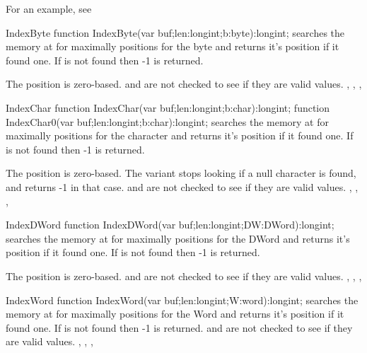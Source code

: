 For an example, see 

\begin{function}{IndexByte}
\Declaration
function  IndexByte(var buf;len:longint;b:byte):longint;
\Description
{} searches the memory at  for maximally 
positions for the byte  and returns it's position if it found one.
If  is not found then -1 is returned.

The position is zero-based.
\Errors
{} and  are not checked to see if they are valid values.
\SeeAlso
{}, , , 
\end{function}


\begin{function}{IndexChar}
\Declaration
function  IndexChar(var buf;len:longint;b:char):longint;
\Declaration
function  IndexChar0(var buf;len:longint;b:char):longint;
\Description
{} searches the memory at  for maximally 
positions for the character  and returns it's position if it found one.
If  is not found then -1 is returned.

The position is zero-based. The  variant stops looking if
a null character is found, and returns -1 in that case.
\Errors
{} and  are not checked to see if they are valid values.
\SeeAlso
{}, , , 
\end{function}


\begin{function}{IndexDWord}
\Declaration
function  IndexDWord(var buf;len:longint;DW:DWord):longint;
\Description
{} searches the memory at  for maximally 
positions for the DWord  and returns it's position if it found one.
If  is not found then -1 is returned.

The position is zero-based.
\Errors
{} and  are not checked to see if they are valid values.
\SeeAlso
{}, , , 
\end{function}


\begin{function}{IndexWord}
\Declaration
function  IndexWord(var buf;len:longint;W:word):longint;
\Description
{} searches the memory at  for maximally 
positions for the Word  and returns it's position if it found one.
If  is not found then -1 is returned.
\Errors
{} and  are not checked to see if they are valid values.
\SeeAlso
{}, , , 
\end{function}

